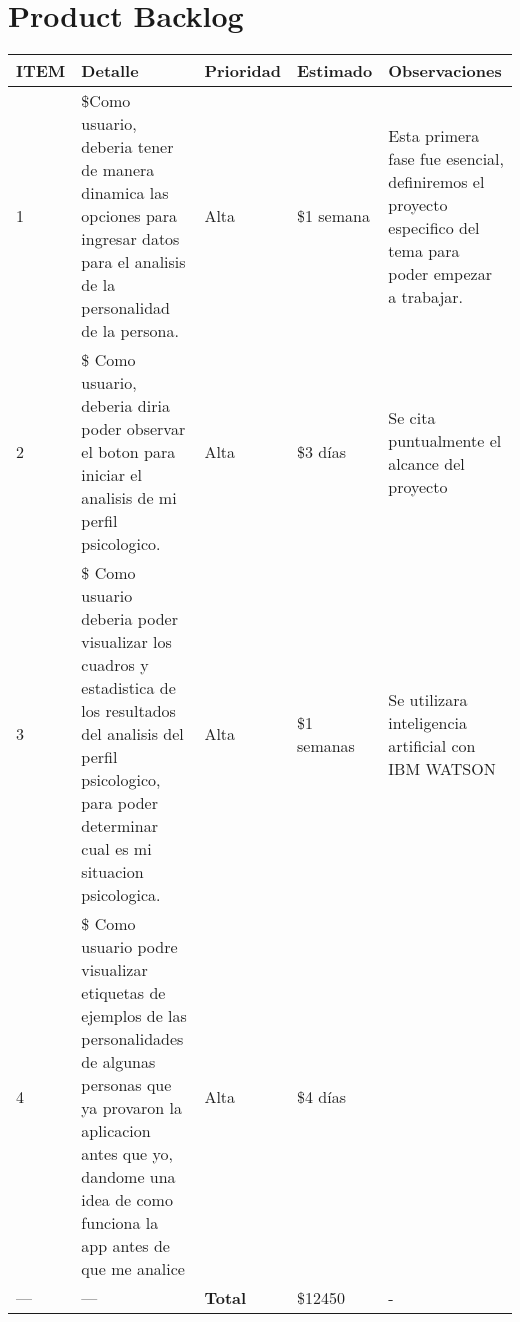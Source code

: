 \chapter{Product Backlog}

\begin{tabular}{ |p{1.0cm}|p{4.5cm}|p{1.5cm}|p{2.5cm}|p{5cm}| }
	\hline
	\rowcolor{gray!40}  \textbf{ITEM}         & \textbf{Detalle}      & \textbf{Prioridad} & \textbf{Estimado} & \textbf{Observaciones}   \\  \hline
	1                        & \raggedleft \$Como usuario, deberia tener de manera dinamica las opciones para ingresar datos
	para el analisis de la personalidad de la persona. &\centering Alta  &\raggedleft \$1 semana  &  Esta primera fase fue esencial, definiremos el proyecto especifico del tema para poder empezar a trabajar.    \\   \hline
	2                        & \raggedleft \$ Como usuario, deberia diria poder observar el boton para iniciar el analisis de mi perfil psicologico. &\centering Alta  &\raggedleft \$3 días  &  Se cita puntualmente el alcance del proyecto    \\   \hline
	3              & \raggedleft \$
	Como usuario deberia poder visualizar los cuadros y estadistica de los resultados del analisis
	del perfil psicologico, para poder determinar cual es mi situacion psicologica.  & \centering Alta  &\raggedleft \$1 semanas   & Se utilizara inteligencia artificial con IBM WATSON\\   \hline
	4             &\raggedleft  \$
	Como usuario podre visualizar etiquetas de ejemplos de las personalidades de algunas personas
	que ya provaron la aplicacion antes que yo, dandome una idea de como funciona la app
	antes de que me analice   &\centering Alta  &\raggedleft  \$4 días   & \\   \hline
	\centering          ---           &   \centering   --- & \cellcolor{gray!40} \textbf{Total}   &\raggedleft \$12450   &  -  \\   \hline
\end{tabular}

